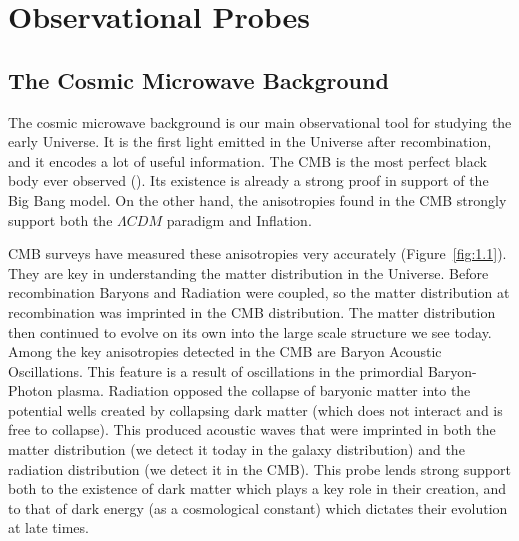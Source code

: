 
\section{Observational Probes}
\subsection{The Cosmic Microwave Background}

The cosmic microwave background is our main observational tool for studying the early Universe. It is the first light emitted in the Universe after recombination, and it encodes a lot of useful information. The CMB is the most perfect black body ever observed (\cite{1999dpf..conf.....W}). Its existence is already a strong proof in support of the Big Bang model. On the other hand, the anisotropies found in the CMB strongly support both the $\Lambda CDM$ paradigm and Inflation.

CMB surveys have measured these anisotropies very accurately (Figure~\ref{fig:1.1}). They are key in understanding the matter distribution in the Universe. Before recombination Baryons and Radiation were coupled, so the matter distribution at recombination was imprinted in the CMB distribution. The matter distribution then continued to evolve on its own into the large scale structure we see today. Among the key anisotropies detected in the CMB are Baryon Acoustic Oscillations. This feature is a result of oscillations in the primordial Baryon-Photon plasma. Radiation opposed the collapse of baryonic matter into the potential wells created by collapsing dark matter (which does not interact and is free to collapse). This produced acoustic waves that were imprinted in both the matter distribution (we detect it today in the galaxy distribution) and the radiation distribution (we detect it in the CMB). This probe lends strong support both to the existence of dark matter which plays a key role in their creation, and to that of dark energy (as a cosmological constant) which dictates their evolution at late times.


